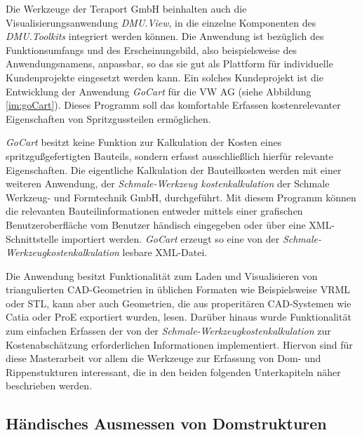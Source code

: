 Die Werkzeuge der Teraport GmbH beinhalten auch die Visualisierungsanwendung \textit{DMU.View}, in die einzelne Komponenten des \textit{DMU.Toolkits} integriert werden k\"onnen. Die Anwendung ist bez\"uglich des Funktionsumfangs und des Erscheinungsbild, also beispielsweise des Anwendungsnamens, anpassbar, so das sie gut als Plattform f\"ur individuelle Kundenprojekte eingesetzt werden kann. Ein solches Kundeprojekt ist die Entwicklung der Anwendung \textit{GoCart} f\"ur die VW AG (siehe Abbildung \ref{im:goCart}). Dieses Programm soll das komfortable Erfassen kostenrelevanter Eigenschaften von Spritzgussteilen erm\"oglichen.  

\textit{GoCart} besitzt keine Funktion zur Kalkulation der Kosten eines spritzgu{\ss}gefertigten Bauteils, sondern erfasst ausschlie{\ss}lich hierf\"ur relevante Eigenschaften. Die eigentliche Kalkulation der Bauteilkosten werden mit einer weiteren Anwendung, der \textit{Schmale-Werkzeug kostenkalkulation} der Schmale Werkzeug- und Formtechnik GmbH, durchgef\"uhrt. Mit diesem Programm k\"onnen die relevanten Bauteilinformationen entweder mittels einer grafischen Benutzeroberfl\"ache vom Benutzer h\"andisch eingegeben oder über eine XML-Schnittstelle importiert werden. \textit{GoCart} erzeugt so eine von der \textit{Schmale-Werkzeugkostenkalkulation} lesbare XML-Datei.

Die Anwendung besitzt Funktionalität zum Laden und Visualisieren von triangulierten CAD-Geometrien in üblichen Formaten wie Beispielsweise VRML oder STL, kann aber auch Geometrien, die aus properit\"aren CAD-Systemen wie Catia oder ProE exportiert wurden, lesen. Dar\"uber hinaus wurde Funktionalit\"at zum einfachen Erfassen der von der \textit{Schmale-Werkzeugkostenkalkulation} zur Kostenabsch\"atzung erforderlichen Informationen implementiert. Hiervon sind f\"ur diese Masterarbeit vor allem die Werkzeuge zur Erfassung von Dom- und Rippenstukturen interessant, die in den beiden folgenden Unterkapiteln n\"aher beschrieben werden.




\subsection{H\"andisches Ausmessen von Domstrukturen}
\label{domeMeasure}

